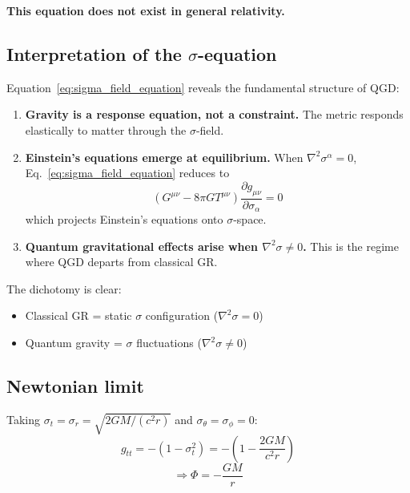 \documentclass[11pt,a4paper]{article}
\theoremstyle{definition}
\theoremstyle{remark}
\begin{document}
	\textbf{This equation does not exist in general relativity.}
	
	\subsection{Interpretation of the $\sigma$-equation}
	
	Equation~\eqref{eq:sigma_field_equation} reveals the fundamental structure of QGD:
	
	\begin{enumerate}
		\item \textbf{Gravity is a response equation, not a constraint.} The metric responds elastically to matter through the $\sigma$-field.
		
		\item \textbf{Einstein's equations emerge at equilibrium.} When $\nabla^2\sigma^\alpha = 0$, Eq.~\eqref{eq:sigma_field_equation} reduces to
		\begin{equation}
			\left(G^{\mu\nu} - 8\pi G T^{\mu\nu}\right) \frac{\partial g_{\mu\nu}}{\partial \sigma_\alpha} = 0
			\label{eq:einstein_projection}
		\end{equation}
		which projects Einstein's equations onto $\sigma$-space.
		
		\item \textbf{Quantum gravitational effects arise when $\nabla^2\sigma \neq 0$.} This is the regime where QGD departs from classical GR.
	\end{enumerate}
	
	The dichotomy is clear:
	\begin{itemize}
		\item Classical GR = static $\sigma$ configuration ($\nabla^2\sigma = 0$)
		\item Quantum gravity = $\sigma$ fluctuations ($\nabla^2\sigma \neq 0$)
	\end{itemize}
	
	\subsection{Newtonian limit}
	
	Taking $\sigma_t = \sigma_r = \sqrt{2GM/(c^2 r)}$ and $\sigma_\theta = \sigma_\phi = 0$:
	\begin{equation}
		g_{tt} = -(1 - \sigma_t^2) = -\left(1 - \frac{2GM}{c^2 r}\right)
		\label{eq:newtonian_gtt}
	\end{equation}
	\begin{equation}
		\Rightarrow \Phi = -\frac{GM}{r}
		\label{eq:newtonian_potential}
	\end{equation}
	
\end{document}

